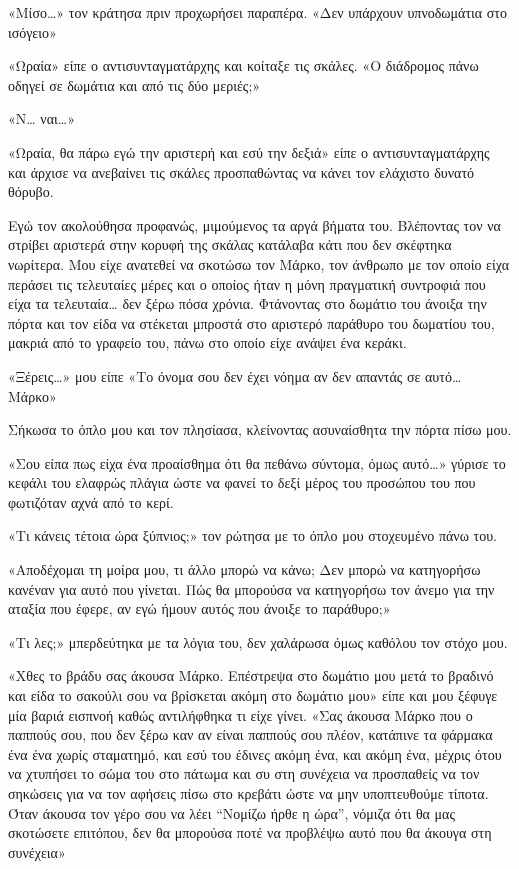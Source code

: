 \documentclass[12pt,twoside, openany]{book}
\begin{document}
«Μίσο…» τον κράτησα πριν προχωρήσει παραπέρα. «Δεν υπάρχουν υπνοδωμάτια στο ισόγειο»

«Ωραία» είπε ο αντισυνταγματάρχης και κοίταξε τις σκάλες. «Ο διάδρομος πάνω οδηγεί σε δωμάτια και από τις δύο μεριές;»

«Ν… ναι…»

«Ωραία, θα πάρω εγώ την αριστερή και εσύ την δεξιά» είπε ο αντισυνταγματάρχης και άρχισε να ανεβαίνει τις σκάλες προσπαθώντας να κάνει τον ελάχιστο δυνατό θόρυβο.

Εγώ τον ακολούθησα προφανώς, μιμούμενος τα αργά βήματα του. Βλέποντας τον να στρίβει αριστερά στην κορυφή της σκάλας κατάλαβα κάτι που δεν σκέφτηκα νωρίτερα. Μου είχε ανατεθεί να σκοτώσω τον Μάρκο, τον άνθρωπο με τον οποίο είχα περάσει τις τελευταίες μέρες και ο οποίος ήταν η μόνη πραγματική συντροφιά που είχα τα τελευταία… δεν ξέρω πόσα χρόνια. Φτάνοντας στο δωμάτιο του άνοιξα την πόρτα και τον είδα να στέκεται μπροστά στο αριστερό παράθυρο του δωματίου του, μακριά από το γραφείο του, πάνω στο οποίο είχε ανάψει ένα κεράκι.

«Ξέρεις…» μου είπε «Το όνομα σου δεν έχει νόημα αν δεν απαντάς σε αυτό… Μάρκο»

Σήκωσα το όπλο μου και τον πλησίασα, κλείνοντας ασυναίσθητα την πόρτα πίσω μου.

«Σου είπα πως είχα ένα προαίσθημα ότι θα πεθάνω σύντομα, όμως αυτό…» γύρισε το κεφάλι του ελαφρώς πλάγια ώστε να φανεί το δεξί μέρος του προσώπου του που φωτιζόταν αχνά από το κερί.

«Τι κάνεις τέτοια ώρα ξύπνιος;» τον ρώτησα με το όπλο μου στοχευμένο πάνω του.

«Αποδέχομαι τη μοίρα μου, τι άλλο μπορώ να κάνω; Δεν μπορώ να κατηγορήσω κανέναν για αυτό που γίνεται. Πώς θα μπορούσα να κατηγορήσω τον άνεμο για την αταξία που έφερε, αν εγώ ήμουν αυτός που άνοιξε το παράθυρο;»

«Τι λες;» μπερδεύτηκα με τα λόγια του, δεν χαλάρωσα όμως καθόλου τον στόχο μου.

«Χθες το βράδυ σας άκουσα Μάρκο. Επέστρεψα στο δωμάτιο μου μετά το βραδινό και είδα το σακούλι σου να βρίσκεται ακόμη στο δωμάτιο μου» είπε και μου ξέφυγε μία βαριά εισπνοή καθώς αντιλήφθηκα τι είχε γίνει. «Σας άκουσα Μάρκο που ο παππούς σου, που δεν ξέρω καν αν είναι παππούς σου πλέον, κατάπινε τα φάρμακα ένα ένα χωρίς σταματημό, και εσύ του έδινες ακόμη ένα, και ακόμη ένα, μέχρις ότου να χτυπήσει το σώμα του στο πάτωμα και συ στη συνέχεια να προσπαθείς να τον σηκώσεις για να τον αφήσεις πίσω στο κρεβάτι ώστε να μην υποπτευθούμε τίποτα. Όταν άκουσα τον γέρο σου να λέει “Νομίζω ήρθε η ώρα”, νόμιζα ότι θα μας σκοτώσετε επιτόπου, δεν θα μπορούσα ποτέ να προβλέψω αυτό που θα άκουγα στη συνέχεια»
\end{document}
